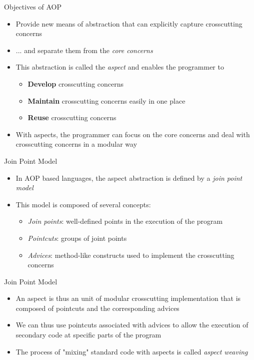\documentclass[11pt]{beamer}
\begin{document}
\begin{frame}{Objectives of AOP}
\begin{itemize}
\item Provide new means of abstraction that can explicitly capture crosscutting concerns
\item ... and separate them from the \emph{core concerns}
\item This abstraction is called the \emph{aspect} and enables the programmer to
   \begin{itemize}
      \item \textbf{Develop} crosscutting concerns
      \item \textbf{Maintain} crosscutting concerns easily in one place
      \item \textbf{Reuse} crosscutting concerns
   \end{itemize}
\item With aspects, the programmer can focus on the core concerns and deal with crosscutting concerns in a modular way
\end{itemize}
\end{frame}

\begin{frame}{Join Point Model}
\begin{itemize}
   \item In AOP based languages, the aspect abstraction is defined by a \emph{join point model}
   \item This model is composed of several concepts:
      \begin{itemize}
         \item \emph{Join points}: well-defined points in the execution of the program
         \item \emph{Pointcuts}: groups of joint points
         \item \emph{Advices}: method-like constructs used to implement the crosscutting concerns
      \end{itemize}
\end{itemize}
\end{frame}

\begin{frame}{Join Point Model}
\begin{itemize}
   \item An aspect is thus an unit of modular crosscutting implementation that is composed of pointcuts and
the corresponding advices
   \item We can thus use pointcuts associated with advices to allow the execution of secondary code at specific parts of the program
   \item The process of "mixing" standard code with aspects is called \emph{aspect weaving}
\end{itemize}
\end{frame}
\end{document}
